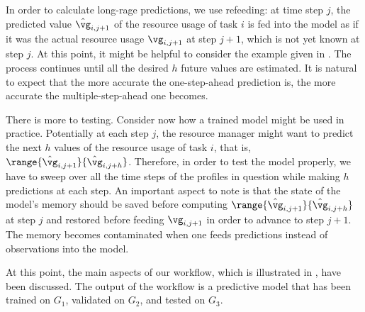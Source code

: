 In order to calculate long-rage predictions, we use refeeding: at time step $j$,
the predicted value $\hat{\vg}_{i, j + 1}$ of the resource usage of task $i$ is
fed into the model as if it was the actual resource usage $\vg_{i, j + 1}$ at
step $j + 1$, which is not yet known at step $j$. At this point, it might be
helpful to consider the example given in . The process
continues until all the desired $h$ future values are estimated. It is natural
to expect that the more accurate the one-step-ahead prediction is, the more
accurate the multiple-step-ahead one becomes.

There is more to testing. Consider now how a trained model might be used in
practice. Potentially at each step $j$, the resource manager might want to
predict the next $h$ values of the resource usage of task $i$, that is,
$\range{\hat{\vg}_{i, j + 1}}{\hat{\vg}_{i, j + h}}$. Therefore, in order to
test the model properly, we have to sweep over all the time steps of the
profiles in question while making $h$ predictions at each step. An important
aspect to note is that the state of the model's memory should be saved before
computing $\range{\hat{\vg}_{i, j + 1}}{\hat{\vg}_{i, j + h}}$ at step $j$ and
restored before feeding $\vg_{i, j + 1}$ in order to advance to step $j + 1$.
The memory becomes contaminated when one feeds predictions instead of
observations into the model.

At this point, the main aspects of our workflow, which is illustrated in
, have been discussed. The output of the workflow is a
predictive model that has been trained on $G_1$, validated on $G_2$, and tested
on $G_3$.
